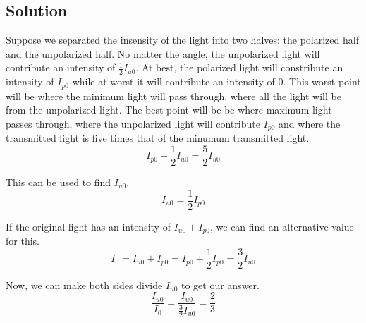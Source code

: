 \documentclass[12pt]{article}
\begin{document}
        \subsection{Solution}
            Suppose we separated the insensity of the light into two halves: the polarized half and the unpolarized half.
            No matter the angle, the unpolarized light will contribute an intensity of $\frac{1}{2}I_{u0}$. 
            At best, the polarized light will constribute an intensity of $I_{p0}$ while at worst it will contribute an intensity of $0$.
            This worst point will be where the minimum light will pass through, where all the light will be from the unpolarized light. 
            The best point will be be where maximum light passes through, where the unpolarized light will contribute $I_{p0}$ and where the transmitted light is five times that of the minumum transmitted light.
            \begin{equation}
                I_{p0} + \frac{1}{2}I_{u0} = \frac{5}{2} I_{u0}
            \end{equation}

            This can be used to find $I_{u0}$.
            \begin{equation}
                I_{u0} = \frac{1}{2} I_{p0}
            \end{equation}

            If the original light has an intensity of $I_{u0} + I_{p0}$, we can find an alternative value for this.
            \begin{equation}
                I_0 =   I_{u0} + I_{p0}
                    =   I_{p0} + \frac{1}{2} I_{p0}
                    =   \frac{3}{2} I_{u0}
            \end{equation}

            Now, we can make both sides divide $I_{u0}$ to get our answer.
            \begin{equation}
                \frac{I_{u0}}{I_0} = \frac{I_{u0}}{\frac{3}{2} I_{u0}}
                    =   \boxed{\frac{2}{3}}
            \end{equation}

    \pagebreak
\end{document}
